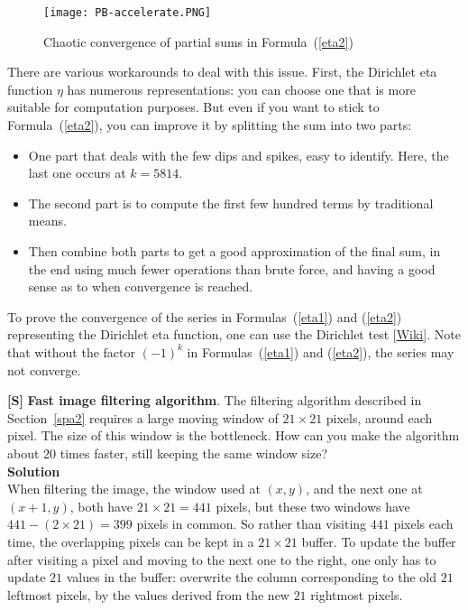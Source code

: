 \documentclass[10pt]{article}
\begin{document}
\begin{Exercise}
\begin{figure}[H]
\centering
\texttt{[image: PB-accelerate.PNG]}
\caption{Chaotic convergence of partial sums in Formula~(\ref{eta2})}
\label{fig:fcc}
\end{figure}

There are various workarounds to deal with this issue. First, the \textcolor{index}{Dirichlet eta function} $\eta$ has numerous representations: you can choose one that is more suitable for
computation purposes. But even if you want to stick to Formula~(\ref{eta2}), you can improve it by splitting the sum into two parts:
\begin{itemize}
\item One part that deals with the few dips and spikes, easy to identify. Here, the last one occurs at $k=5814$.
\item The second part is to compute the first few hundred terms by traditional means.
\item Then combine both parts to get a good approximation of the final sum, in the end using much fewer operations than brute force, and having a good sense as to when convergence is reached.
\end{itemize}
To prove the convergence of the series in Formulas~(\ref{eta1}) and (\ref{eta2}) representing the Dirichlet eta function, one can use the Dirichlet test [\href{https://bit.ly/3prDAL1}{Wiki}]. Note that without the factor $(-1)^k$ in Formulas~(\ref{eta1}) and (\ref{eta2}), the series may not converge.
\end{Exercise}

\begin{Exercise}\label{fastfilter}{\bf [S]}
{\bf Fast image filtering algorithm}.  The filtering algorithm described in  Section~\ref{spa2} requires a large moving window of $21\times 21$ pixels, around each pixel. The size of this window is the bottleneck. How can you make the algorithm about $20$ times faster, still keeping the same window size? \vspace{1ex} \\
{\bf Solution} \vspace{1ex} \\
When filtering the image, the window used at $(x,y)$, and the next one at $(x+1,y)$, both have $21\times 21 = 441$ pixels, but these two windows have $441 - (2\times 21) = 399$ pixels in common. So rather than visiting $441$ pixels each time, the overlapping pixels can be kept in a $21 \times 21$ buffer. To update the buffer after visiting a pixel and moving to the next one to the right, one only has to update $21$ values in the buffer: overwrite the column corresponding to the old $21$ leftmost pixels, by the values derived from the new $21$ rightmost pixels.
\end{Exercise}
\end{document}
